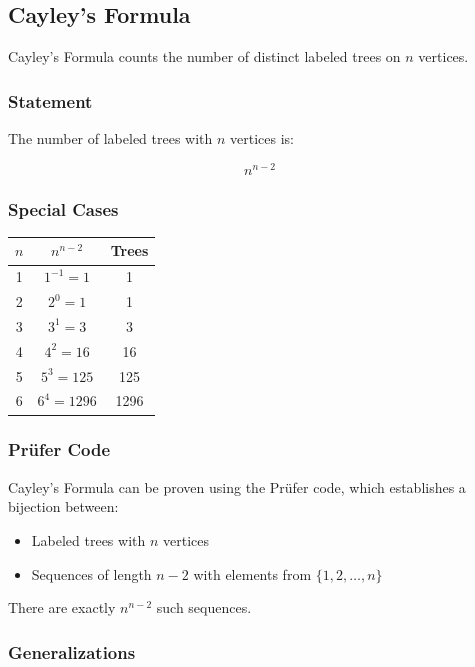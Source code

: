 \subsection{Cayley's Formula}

Cayley's Formula counts the number of distinct labeled trees on $n$ vertices.

\subsubsection{Statement}

The number of labeled trees with $n$ vertices is:

\begin{equation}
    n^{n-2}
\end{equation}

\subsubsection{Special Cases}

\begin{center}
\begin{tabular}{c|c|c}
$n$ & $n^{n-2}$ & Trees \\
\hline
1 & $1^{-1} = 1$ & 1 \\
2 & $2^0 = 1$ & 1 \\
3 & $3^1 = 3$ & 3 \\
4 & $4^2 = 16$ & 16 \\
5 & $5^3 = 125$ & 125 \\
6 & $6^4 = 1296$ & 1296 \\
\end{tabular}
\end{center}

\subsubsection{Prüfer Code}

Cayley's Formula can be proven using the Prüfer code, which establishes a bijection between:

\begin{itemize}
    \item Labeled trees with $n$ vertices
    \item Sequences of length $n-2$ with elements from $\{1, 2, \ldots, n\}$
\end{itemize}

There are exactly $n^{n-2}$ such sequences.

\subsubsection{Generalizations}

